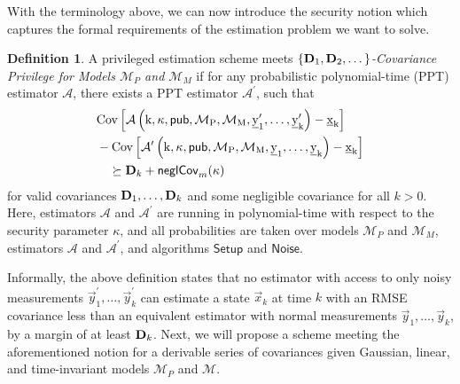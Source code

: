 \documentclass[conference]{IEEEtran}
\theoremstyle{definition}
\newtheorem{definition}{Definition}[section]
\theoremstyle{definition}
\theoremstyle{remark}
\begin{document}
With the terminology above, we can now introduce the security notion which captures the formal requirements of the estimation problem we want to solve.
\begin{definition}\label{def:cov_privilege_security_notion}
   A privileged estimation scheme meets \textit{$\{{{\mathbf{D}}}_1,{{\mathbf{D}}}_2,\dots\}$-Covariance Privilege for Models $\mathcal{M}_P$ and $\mathcal{M}_M$} if for any probabilistic polynomial-time (PPT) estimator $\mathcal{A}$, there exists a PPT estimator $\mathcal{A}^\prime$, such that
   \begin{equation}\label{eqn:cov_privilege}
      \begin{split}
         &\operatorfont{Cov}\left[\mathcal{A}\left(k, \kappa, \mathsf{pub}, \mathcal{M}_P, \mathcal{M}_M, \vec{y}^\prime_1,\dots,\vec{y}^\prime_k\right) - \vec{x}_k \right]\\
         &-\operatorfont{Cov}\left[\mathcal{A}^\prime\left(k, \kappa, \mathsf{pub}, \mathcal{M}_P, \mathcal{M}_M, \vec{y}_1,\dots,\vec{y}_k\right) - \vec{x}_k \right]\\
         &\quad\succeq \mat{D}_k + \mathsf{neglCov}_m(\kappa)
      \end{split}
   \end{equation}
   for valid covariances ${{\mathbf{D}}}_1,\dots,{{\mathbf{D}}}_k$ and some negligible covariance for all $k>0$. Here, estimators $\mathcal{A}$ and $\mathcal{A}^\prime$ are running in polynomial-time with respect to the security parameter $\kappa$, and all probabilities are taken over models $\mathcal{M}_P$ and $\mathcal{M}_M$, estimators $\mathcal{A}$ and $\mathcal{A}^\prime$, and algorithms $\mathsf{Setup}$ and $\mathsf{Noise}$.
\end{definition}

Informally, the above definition states that no estimator with access to only noisy measurements $\vec{y}^\prime_1,\dots,\vec{y}^\prime_k$ can estimate a state $\vec{x}_k$ at time $k$ with an RMSE covariance less than an equivalent estimator with normal measurements $\vec{y}_1,\dots,\vec{y}_k$, by a margin of at least ${{\mathbf{D}}}_k$. Next, we will propose a scheme meeting the aforementioned notion for a derivable series of covariances given Gaussian, linear, and time-invariant models $\mathcal{M}_P$ and $\mathcal{M}$.

% 
%                                                                                
%                                                                                
%                                                                                
% 
\end{document}
